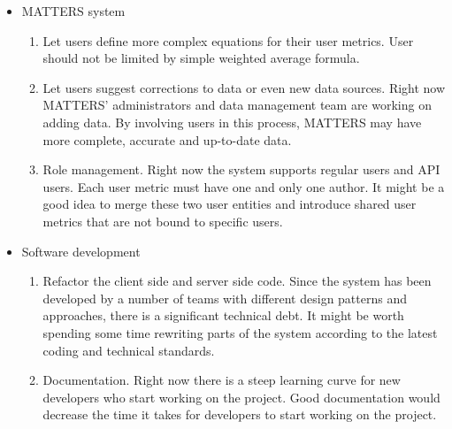  	\begin{itemize}
 		\item MATTERS system
 		\begin{enumerate}
 			\item
 			Let users define more complex equations for their user metrics.
 			User should not be limited by simple weighted average formula.
 			\item
 			Let users suggest corrections to data or even new data sources. Right now 
 			MATTERS' administrators and data management team are working on
 			adding data. By involving users in this process, MATTERS may have 
 			more complete, accurate and up-to-date data.
 			\item
 			Role management. Right now the system supports regular users and API users. 
 			Each user metric must have one and only one author. It might be a good idea 
 			to merge these two user entities and introduce shared user metrics that are 
 			not bound to specific users.
 		\end{enumerate}
 		\item Software development
 		\begin{enumerate}
 			\item
 			Refactor the client side and server side code. Since the system 
 			has been developed by a number of teams with different design 
 			patterns and approaches, there is a significant technical debt. 
 			It might be worth spending some time rewriting parts of the system 
 			according to the latest coding and technical standards.
 			\item
 			Documentation. Right now there is a steep learning curve for new 
 			developers who start working on the project. Good documentation would decrease the time it takes for developers to start working 
 			on the project.
 		\end{enumerate}
 	\end{itemize}